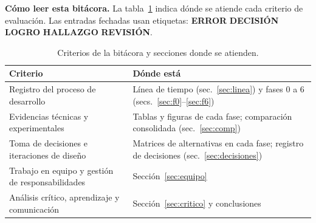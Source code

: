 \documentclass[11pt,a4paper]{article}
\newcommand{\etq}[2]{\colorbox{#1!15}{\textcolor{#1}{\scriptsize\bfseries #2}}}
\newcommand{\terr}{\etq{nok}{ERROR}}
\newcommand{\tdec}{\etq{usco}{DECISIÓN}}
\newcommand{\tlog}{\etq{ok}{LOGRO}}
\newcommand{\thal}{\etq{pend}{HALLAZGO}}
\newcommand{\trev}{\etq{gris}{REVISIÓN}}
\begin{document}
\begin{abstract}
\noindent Esta bitácora reconstruye el recorrido del equipo durante el semestre, desde el primer reto de diseño (un amplificador de cuatro etapas con LM358) hasta una tarjeta de expansión para la PSoC 5LP lista para fabricación industrial. El hilo conductor es el ciclo construir--medir--aprender \cite{ries}: cada producto se construyó con lo mínimo necesario, se midió, y su resultado definió el cambio del siguiente. Se registran las alternativas evaluadas, las decisiones y su justificación técnica, las fallas reales (un pin digital en una salida analógica, una calibración en el nodo equivocado, una red flotante en el esquemático, un presupuesto excedido) y la forma en que se corrigieron. Las evidencias incluyen cálculos, simulaciones, capturas, fotografías y mediciones con osciloscopio y multímetro, con la comparación entre valores teóricos, simulados y experimentales. El producto final clasifica la humedad en tres estados con procesamiento 100~\% analógico: el suelo seco (\SI{2.68}{V}) enciende el LED rojo y el húmedo (\SI{2.09}{V}) el verde; su versión industrial pasó ERC y DRC sin errores y se cotizó en USD~19,75 para dos tarjetas ensambladas.
\end{abstract}

\noindent\textbf{Cómo leer esta bitácora.} La tabla~\ref{tab:rubrica} indica dónde se atiende cada criterio de evaluación. Las entradas fechadas usan etiquetas: \terr{} \tdec{} \tlog{} \thal{} \trev{}.

\begin{table}[H]\centering\small
\caption{Criterios de la bitácora y secciones donde se atienden.}\label{tab:rubrica}
\begin{tabularx}{\linewidth}{>{\raggedright\arraybackslash}p{5.2cm}X}
\toprule
Criterio & Dónde está \\
\midrule
Registro del proceso de desarrollo & Línea de tiempo (sec.~\ref{sec:linea}) y fases 0 a 6 (secs.~\ref{sec:f0}--\ref{sec:f6}) \\
Evidencias técnicas y experimentales & Tablas y figuras de cada fase; comparación consolidada (sec.~\ref{sec:comp}) \\
Toma de decisiones e iteraciones de diseño & Matrices de alternativas en cada fase; registro de decisiones (sec.~\ref{sec:decisiones}) \\
Trabajo en equipo y gestión de responsabilidades & Sección~\ref{sec:equipo} \\
Análisis crítico, aprendizaje y comunicación & Sección~\ref{sec:critico} y conclusiones \\
\bottomrule
\end{tabularx}
\end{table}
\end{document}
